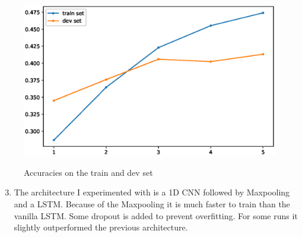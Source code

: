 \documentclass[a4paper,11pt, hidelinks]{article}
\begin{document}
\begin{figure}[H]
\centering
 \includegraphics[scale=0.5]{plot.eps}  \\
\caption{Accuracies on the train and dev set}
\end{figure}

\begin{enumerate}[label=(\alph*)]
\setcounter{enumi}{2}
\item The architecture I experimented with is a 1D CNN followed by Maxpooling and a LSTM. Because of the Maxpooling it is much faster to train than the vanilla LSTM. Some dropout is added to prevent overfitting. For some runs it slightly outperformed the previous architecture.
\end{enumerate}
\end{document}
